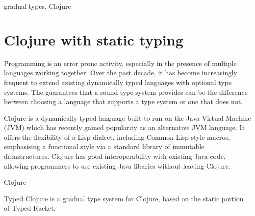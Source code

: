 \documentclass[preprint,9pt]{sigplanconf}
\begin{document}
\keywords
gradual types, Clojure

\section{Clojure with static typing}


Programming is an error prone activity, especially in the presence of
multiple languages working together. Over the past decade, it has become increasingly
frequent to extend existing dynamically typed languages with optional type systems.
The guarantees that a sound type system provides can be the difference between
choosing a language that supports a type system or one that does not.


Clojure is a dynamically typed language built to run on the Java Virtual Machine (JVM)
which has recently gained popularity as an alternative JVM language.
It offers the flexibility of a Lisp dialect, including Common Lisp-style macros,
emphasising a functional style via a standard library of immutable datastructures. 
Clojure has good interoperability with existing Java code, allowing programmers to
use existing Java libaries without leaving Clojure.


Clojure

Typed Clojure is a gradual type system for Clojure, based on the
static portion of Typed Racket.


\end{document}

